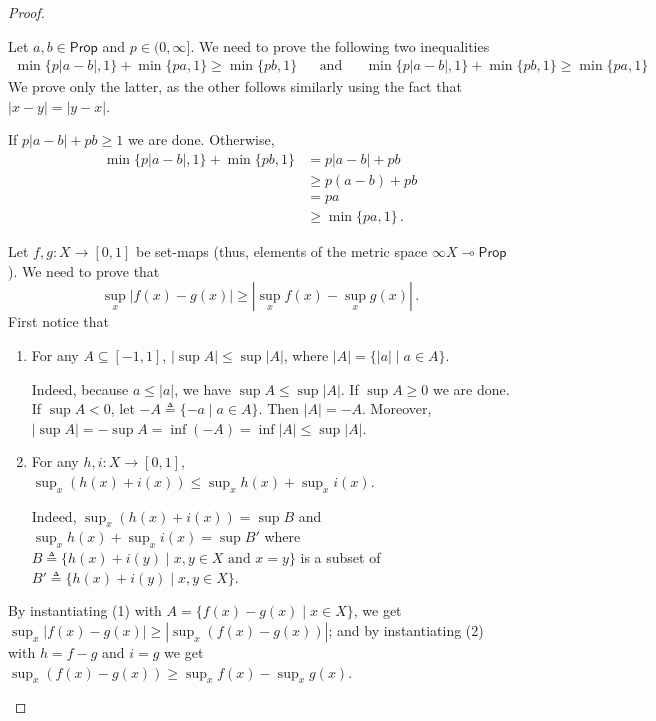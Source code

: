 \documentclass[a4paper,UKenglish,cleveref, autoref, thm-restate]{lipics-v2021}
\newcommand{\lol}{\mathbin{\multimap}}
\newcommand{\mexp}{\lol}
\newcommand{\scaling}{}
\newcommand{\Prop}{\mathsf{Prop}}
\newcommand{\defeq}{\triangleq}
\begin{document}
\begin{proof}
\begin{description}[font=\sc,wide]
    \item[Case $\min\{ p\cdot -, 1\}$:]
    Let $a,b\in \Prop$ and $p \in (0,\infty]$. We need to prove the following two
    inequalities
    \begin{align*}
        \min \{ p|a-b|,1\} + \min\{pa, 1\} \geq \min\{pb, 1\}
        &&\text{and}&&
        \min \{ p|a-b|, 1\} + \min\{pb, 1\} \geq \min\{pa, 1\}
    \end{align*}
    We prove only the latter, as the other follows similarly using the fact
    that $|x-y| = |y-x|$.

    If $p|a-b| + pb \geq 1$ we are done. Otherwise,
    \begin{align*}
        \min \{ p|a-b|, 1\} + \min\{pb, 1\}
        &= p|a-b| + pb \\
        &\geq p(a-b) + pb \\
        &= pa \\
        &\geq \min\{pa, 1\} \,.
    \end{align*}
    
    \item[Case $\sup$:]
    Let $f,g \colon X \to [0,1]$ be set-maps (thus, elements of  the metric space $\infty\scaling X \mexp \Prop$). We need to prove that
    \begin{equation*}
        \sup_{x} |f(x)-g(x)| \geq |\sup_x f(x) - \sup_x g(x)| \,.
    \end{equation*}
    First notice that 
    \begin{enumerate}[leftmargin=3\parindent, labelindent=\parindent]
        \item For any $A\subseteq [-1,1]$, $|\sup A| \leq \sup |A|$, where $|A| = \{|a| \mid a \in A\}$. 
        
        Indeed, because $a \leq |a|$, we have $\sup A \leq \sup |A|$. 
        If $\sup A \geq 0$ we are done. 
        If $\sup A < 0$, let $- A \defeq \{ -a \mid a \in A \}$.
        Then $|A| = -A$. Moreover,
        $|\sup A| = - \sup A = \inf(-A) = \inf|A| \leq \sup |A|$.
        \item For any $h,i\colon X \to [0,1]$, $\sup_x (h(x)+i(x)) \leq \sup_x h(x) + \sup_x i(x)$.

        Indeed, $\sup_x (h(x)+i(x)) = \sup B$ and $\sup_x h(x) + \sup_x i(x) = \sup B'$
        where $B \defeq \{h(x)+i(y) \mid x,y\in X \text{ and } x=y \}$ is a subset of $B' \defeq \{h(x)+i(y) \mid x,y\in X \}$.
    \end{enumerate}
    By instantiating (1) with $A = \{f(x) - g(x) \mid x \in X\}$, we get $\sup_x |f(x) - g(x)| \geq |\sup_x (f(x) - g(x))|$; and by instantiating (2) with $h = f-g$ and $i = g$
    we get $\sup_x (f(x)-g(x)) \geq \sup_x f(x) - \sup_x g(x)$.
    

\end{description}
\end{proof}
\end{document}

